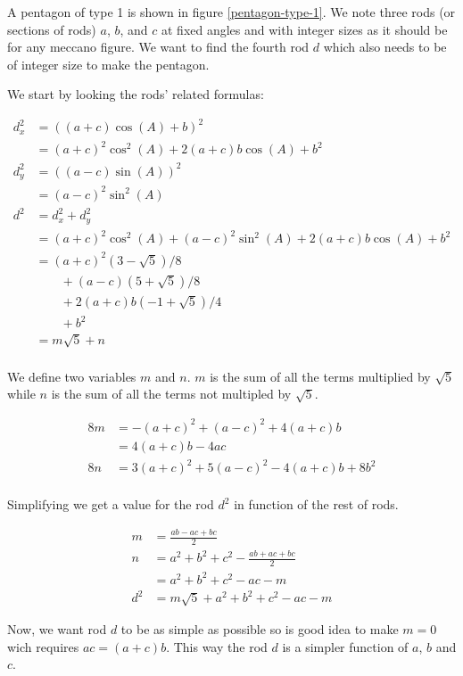 \documentclass[11pt]{article}
\begin{document}
A pentagon of type 1 is shown in figure \ref{pentagon-type-1}. We note three rods (or sections of rods) $a$, $b$, and $c$ at fixed angles and with integer sizes as it should be for any meccano figure. We want to find the fourth rod $d$ which also needs to be of integer size to make the pentagon.


We start by looking the rods' related formulas:

\begin{align*}
d_x^2 &= ( (a + c)\cos(A) + b)^2 \\
      &= (a + c)^2\cos^2(A) + 2(a + c)b\cos(A) + b^2 \\
d_y^2 &= ( (a - c)\sin(A))^2 \\
      &= (a - c)^2\sin^2(A) \\
d^2 &= d_x^2 + d_y^2 \\
    &= (a + c)^2\cos^2(A)
    + (a - c)^2\sin^2(A)
    + 2(a + c)b\cos(A)
    + b^2 \\
    &= (a + c)^2(3 - \sqrt{5})/8 \\
    &\qquad + (a - c)(5 + \sqrt{5})/8 \\
    &\qquad + 2(a + c)b(-1 + \sqrt{5})/4 \\
    &\qquad + b^2 \\
    &= m\sqrt{5} + n \\
\end{align*}

We define two variables $m$ and $n$. $m$ is the sum of all the terms multiplied by $\sqrt{5}$ while $n$ is the sum of all the terms not multipled by $\sqrt{5}$.

\begin{align*}
8m  &= -(a + c)^2 + (a - c)^2 + 4(a + c)b \\
    &= 4(a + c)b - 4ac \\
8n &= 3(a + c)^2 + 5(a - c)^2 - 4(a + c)b + 8b^2 \\
\end{align*}

Simplifying we get a value for the rod $d^2$ in function of the rest of rods.

\begin{align*}
m  &= \frac{ ab - ac + bc}{2} \\
n  &= a^2 + b^2 + c^2 - \frac{ ab + ac + bc }{2} \\
   &= a^2 + b^2 + c^2 - ac - m \\
d^2 &= m\sqrt{5} + a^2 + b^2 + c^2 - ac - m
\end{align*}

Now, we want rod $d$ to be as simple as possible so is good idea to make $m = 0$ wich requires $ac = (a + c)b$. This way the rod $d$ is a simpler function of $a$, $b$ and $c$.
\end{document}

